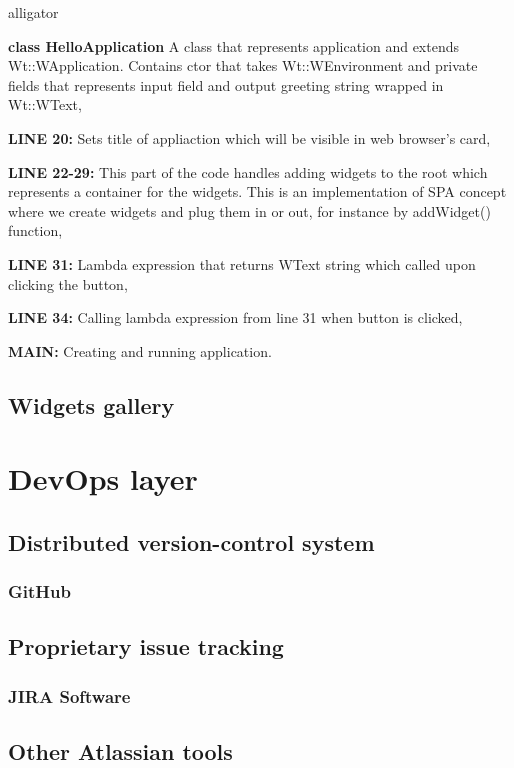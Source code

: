 \documentclass[a4paper,12pt]{article}
\begin{document}
{{\begin{labeling}{alligator}
\item [\textbf{class HelloApplication}] A class that represents application and extends Wt::WApplication. Contains ctor that takes Wt::WEnvironment and private fields that represents input field and output greeting string wrapped in Wt::WText,
\item [\textbf{LINE 20:}] Sets title of appliaction which will be visible in web browser's card,
\item [\textbf{LINE 22-29:}] This part of the code handles adding widgets to the root which represents a container for the widgets. This is an implementation of SPA concept where we create widgets and plug them in or out, for instance by addWidget() function,
\item [\textbf{LINE 31:}] Lambda expression that returns WText string which called upon clicking the button,
\item [\textbf{LINE 34:}] Calling lambda expression from line 31 when button is clicked,
\item [\textbf{MAIN:}] Creating and running application.
\end{labeling} 


}
\subsection{Widgets gallery}
\section{DevOps layer}
\subsection{Distributed version-control system}}
\subsubsection{GitHub}
\subsection{Proprietary issue tracking}
\subsubsection{JIRA Software}
\subsection{Other Atlassian tools}
\end{document}
